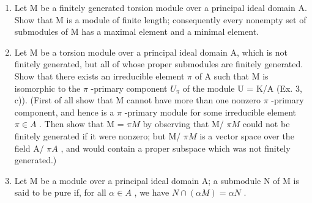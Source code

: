 \begin{enumerate}
\def\labelenumi{\arabic{enumi})}
\setcounter{enumi}{4}
\item
  Let M be a finitely generated torsion module over a principal ideal domain A. Show that M is a module of finite length; consequently every nonempty set of submodules of M has a maximal element and a minimal element.
\item
  Let M be a torsion module over a principal ideal domain A, which is not finitely generated, but all of whose proper submodules are finitely generated. Show that there exists an irreducible element \(\pi\) of A such that M is isomorphic to the \(\pi\) -primary component \(U_{\pi}\) of the module U = K/A (Ex. 3, c)). (First of all show that M cannot have more than one nonzero \(\pi\) -primary component, and hence is a \(\pi\) -primary module for some irreducible element \(\pi \in A\) . Then show that M = \(\pi M\) by observing that M/ \(\pi M\) could not be finitely generated if it were nonzero; but M/ \(\pi M\) is a vector space over the field A/ \(\pi A\) , and would contain a proper subspace which was not finitely generated.)
\item
  Let M be a module over a principal ideal domain A; a submodule N of M is said to be pure if, for all \(\alpha \in A\) , we have \(N \cap (\alpha M) = \alpha N\) .
\end{enumerate}

